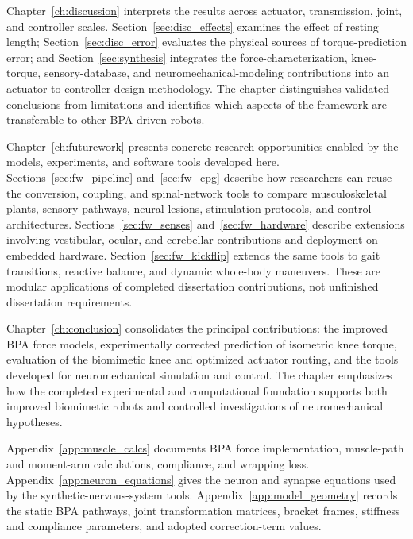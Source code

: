 \begin{reviewchange}
Chapter~\ref{ch:discussion} interprets the results across actuator, transmission, joint, and controller scales. Section~\ref{sec:disc_effects} examines the effect of resting length; Section~\ref{sec:disc_error} evaluates the physical sources of torque-prediction error; and Section~\ref{sec:synthesis} integrates the force-characterization, knee-torque, sensory-database, and neuromechanical-modeling contributions into an actuator-to-controller design methodology. The chapter distinguishes validated conclusions from limitations and identifies which aspects of the framework are transferable to other BPA-driven robots.

Chapter~\ref{ch:futurework} presents concrete research opportunities enabled by the models, experiments, and software tools developed here. Sections~\ref{sec:fw_pipeline} and~\ref{sec:fw_cpg} describe how researchers can reuse the conversion, coupling, and spinal-network tools to compare musculoskeletal plants, sensory pathways, neural lesions, stimulation protocols, and control architectures. Sections~\ref{sec:fw_senses} and~\ref{sec:fw_hardware} describe extensions involving vestibular, ocular, and cerebellar contributions and deployment on embedded hardware. Section~\ref{sec:fw_kickflip} extends the same tools to gait transitions, reactive balance, and dynamic whole-body maneuvers. These are modular applications of completed dissertation contributions, not unfinished dissertation requirements.

Chapter~\ref{ch:conclusion} consolidates the principal contributions: the improved BPA force models, experimentally corrected prediction of isometric knee torque, evaluation of the biomimetic knee and optimized actuator routing, and the tools developed for neuromechanical simulation and control. The chapter emphasizes how the completed experimental and computational foundation supports both improved biomimetic robots and controlled investigations of neuromechanical hypotheses.

Appendix~\ref{app:muscle_calcs} documents BPA force implementation, muscle-path and moment-arm calculations, compliance, and wrapping loss. Appendix~\ref{app:neuron_equations} gives the neuron and synapse equations used by the synthetic-nervous-system tools. Appendix~\ref{app:model_geometry} records the static BPA pathways, joint transformation matrices, bracket frames, stiffness and compliance parameters, and adopted correction-term values.
\end{reviewchange}

